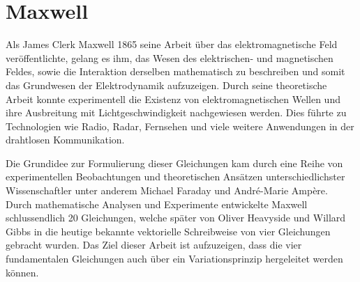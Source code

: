 %
%
%
%

\chapter{Maxwell\label{chapter:maxwell}}
\begin{refsection}

Als James Clerk Maxwell 1865 seine Arbeit über das elektromagnetische Feld veröffentlichte, gelang es ihm, das Wesen des elektrischen- und magnetischen Feldes, sowie die Interaktion derselben mathematisch zu beschreiben und somit das Grundwesen der Elektrodynamik aufzuzeigen.
Durch seine theoretische Arbeit konnte experimentell die Existenz von elektromagnetischen Wellen und ihre Ausbreitung mit Lichtgeschwindigkeit nachgewiesen werden.
Dies führte zu Technologien wie Radio, Radar, Fernsehen und viele weitere Anwendungen in der drahtlosen Kommunikation.

Die Grundidee zur Formulierung dieser Gleichungen kam durch eine Reihe von experimentellen Beobachtungen und theoretischen Ansätzen unterschiedlichster Wissenschaftler unter anderem Michael Faraday und André-Marie Ampère.
Durch mathematische Analysen und Experimente entwickelte Maxwell schlussendlich 20 Gleichungen, welche später von Oliver Heavyside und Willard Gibbs in die heutige bekannte vektorielle Schreibweise von vier Gleichungen gebracht wurden.
Das Ziel dieser Arbeit ist aufzuzeigen, dass die vier fundamentalen Gleichungen  auch über ein Variationsprinzip hergeleitet werden können.





%
%
%
%


\printbibliography[heading=subbibliography]

\end{refsection}
